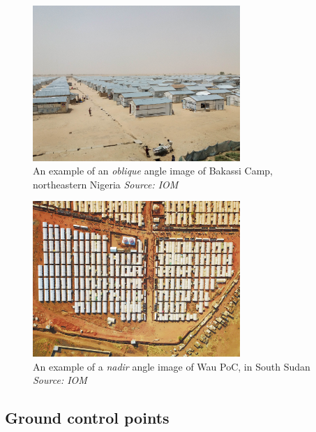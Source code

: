 \documentclass[
  a4paper,
  onecolumn,
  oneside]{book}
\begin{document}
\begin{figure}

{\centering \includegraphics[width=0.7\textwidth,height=\textheight]{part2/images/bakassi.jpg}

}

\caption{An example of an \emph{oblique} angle image of Bakassi Camp,
northeastern Nigeria \emph{Source: IOM}}

\end{figure}

\begin{figure}

{\centering \includegraphics[width=0.7\textwidth,height=\textheight]{part2/images/wau2.jpg}

}

\caption{An example of a \emph{nadir} angle image of Wau PoC, in South
Sudan \emph{Source: IOM}}

\end{figure}

\hypertarget{ground-control-points}{%
\subsection{Ground control points}\label{ground-control-points}}
\end{document}
